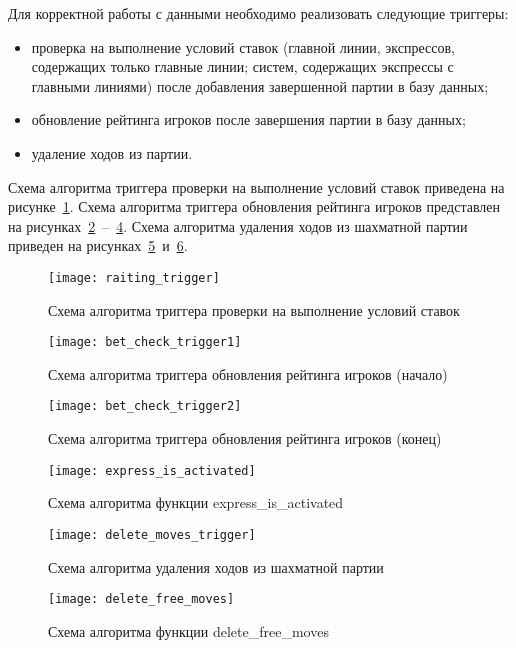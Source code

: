 Для корректной работы с данными необходимо реализовать следующие триггеры:
\begin{itemize}
	\item проверка на выполнение условий ставок (главной линии, экспрессов, содержащих только главные линии; систем, содержащих экспрессы с главными линиями) после добавления завершенной партии в базу данных;
	\item обновление рейтинга игроков после завершения партии в базу данных;
	\item удаление ходов из партии.
\end{itemize}

Схема алгоритма триггера проверки на выполнение условий ставок приведена на рисунке~\ref{raiting_trigger_flowchart}.
Схема алгоритма триггера обновления рейтинга игроков представлен на рисунках~\ref{bet_check_trigger1}~--~\ref{express_is_activated}.
Схема алгоритма удаления ходов из шахматной партии приведен на рисунках~\ref{delete_moves_trigger_flowchart}~и~\ref{delete_free_moves}.
\begin{figure}[H]
	\centering
	\texttt{[image: raiting\_trigger]}
	\caption{Схема алгоритма триггера проверки на выполнение условий ставок}
	\label{raiting_trigger_flowchart}
\end{figure}
\begin{figure}[H]
	\centering
	\texttt{[image: bet\_check\_trigger1]}
	\caption{Схема алгоритма триггера обновления рейтинга игроков (начало)}
	\label{bet_check_trigger1}
\end{figure}
\begin{figure}[H]
	\centering
	\texttt{[image: bet\_check\_trigger2]}
	\caption{Схема алгоритма триггера обновления рейтинга игроков (конец)}
	\label{bet_check_trigger2}
\end{figure}
\begin{figure}[H]
	\centering
	\texttt{[image: express\_is\_activated]}
	\caption{Схема алгоритма функции express\_is\_activated}
	\label{express_is_activated}
\end{figure}
\begin{figure}[H]
	\centering
	\texttt{[image: delete\_moves\_trigger]}
	\caption{Схема алгоритма удаления ходов из шахматной партии}
	\label{delete_moves_trigger_flowchart}
\end{figure}
\begin{figure}[H]
	\centering
	\texttt{[image: delete\_free\_moves]}
	\caption{Схема алгоритма функции delete\_free\_moves}
	\label{delete_free_moves}
\end{figure}

